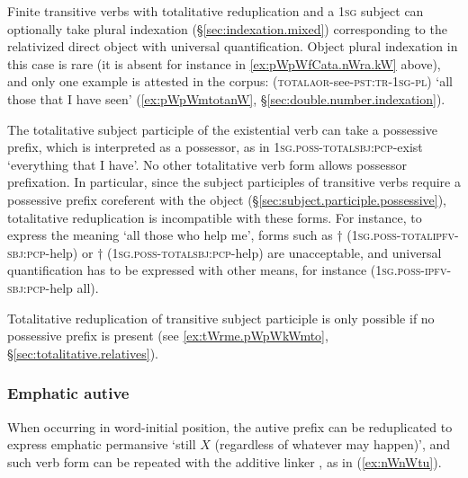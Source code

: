 Finite transitive verbs with totalitative reduplication and a \textsc{1sg} subject can optionally take plural indexation (§\ref{sec:indexation.mixed}) corresponding to the relativized direct object with universal quantification. Object plural indexation in this case is rare (it is absent for instance in \ref{ex:pWpWfCata.nWra.kW} above), and only one example is attested in the corpus:  (\textsc{total}\redp{}\textsc{aor}-see-\textsc{pst}:\textsc{tr}-\textsc{1sg}-\textsc{pl}) `all those that I have seen' (\ref{ex:pWpWmtotanW}, §\ref{sec:double.number.indexation}).


The totalitative subject participle of the existential verb  can take a possessive prefix, which is interpreted as a possessor, as in  \textsc{1sg}.\textsc{poss}-\textsc{total}\redp{}\textsc{sbj}:\textsc{pcp}-exist `everything that I have'. No other totalitative verb form allows possessor prefixation. In particular, since the subject participles of transitive verbs require a possessive prefix coreferent with the object (§\ref{sec:subject.participle.possessive}), totalitative reduplication is incompatible with these forms. For instance, to express the meaning `all those who help me', forms such as $\dagger$ (\textsc{1sg}.\textsc{poss}-\textsc{total}\redp{}\textsc{ipfv}-\textsc{sbj}:\textsc{pcp}-help) or $\dagger$ (\textsc{1sg}.\textsc{poss}-\textsc{total}\redp{}\textsc{sbj}:\textsc{pcp}-help) are unacceptable, and universal quantification has to be expressed with other means, for instance  (\textsc{1sg}.\textsc{poss}-\textsc{ipfv}-\textsc{sbj}:\textsc{pcp}-help all).

Totalitative reduplication of transitive subject participle is only possible if no possessive prefix is present (see \ref{ex:tWrme.pWpWkWmto}, §\ref{sec:totalitative.relatives}).

 

\subsubsection{Emphatic autive}  \label{sec:emphatic.autive}
When occurring in word-initial position, the  autive prefix  can be reduplicated to express emphatic permansive `still $X$ (regardless of whatever may happen)', and such verb form can be repeated with the additive linker , as in (\ref{ex:nWnWtu}).

